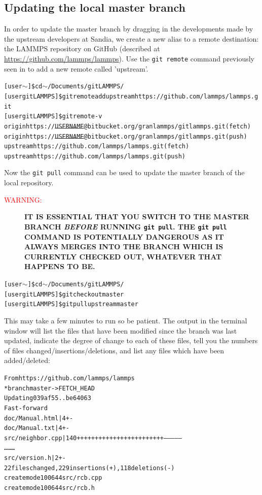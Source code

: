 \documentclass[a4paper,oneside,11pt]{article}
\begin{document}
\subsection{Updating the local master branch}\label{ssec:ulmb}
In order to update the master branch by dragging in the developments made by the upstream developers at Sandia, we create a new alias to a remote destination: the LAMMPS repository on GitHub (described at \url{https://github.com/lammps/lammps}). Use the \texttt{git remote} command previously seen in  to add a new remote called 'upstream'. 
\begin{alltt}
[user \(\sim\)]\$ cd \(\sim\)/Documents/gitLAMMPS/
[user gitLAMMPS]\$ git remote add upstream https://github.com/lammps/lammps.git
[user gitLAMMPS]\$ git remote -v
origin	https://\sout{USERNAME}@bitbucket.org/granlammps/gitlammps.git (fetch)
origin	https://\sout{USERNAME}@bitbucket.org/granlammps/gitlammps.git (push)
upstream	https://github.com/lammps/lammps.git (fetch)
upstream	https://github.com/lammps/lammps.git (push)
\end{alltt}
Now the \texttt{git pull} command can be used to update the master branch of the local repository.
\begin{description}
 \item[\textcolor{red}{WARNING:}] \bfseries\MakeUppercase{It is essential that you switch to the master branch \emph{before} running \texttt{git pull}. The \texttt{git pull} command is potentially dangerous as it always merges into the branch which is currently checked out, whatever that happens to be.}
\end{description}
\begin{alltt}
[user \(\sim\)]\$ cd \(\sim\)/Documents/gitLAMMPS/
[user gitLAMMPS]\$ git checkout master
[user gitLAMMPS]\$ git pull upstream master
\end{alltt}
This may take a few minutes to run so be patient. The output in the terminal window will list the files that have been modified since the branch was last updated, indicate the degree of change to each of these files, tell you the numbers of files changed\slash insertions\slash deletions, and list any files which have been added\slash deleted:
\begin{alltt}
From https://github.com/lammps/lammps
 * branch            master     -> FETCH_HEAD
Updating 039af55..be64063
Fast-forward
 doc/Manual.html                 |    4 +-
 doc/Manual.txt                  |    4 +-
 src/neighbor.cpp                |  140 ++++++++++++++++++++++++---------------
\ldots\hspace*{10em}\ldots\hspace*{10em}\ldots
 src/version.h                   |    2 +-
 22 files changed, 229 insertions(+), 118 deletions(-)
 create mode 100644 src/rcb.cpp
 create mode 100644 src/rcb.h
\end{alltt}
\end{document}
